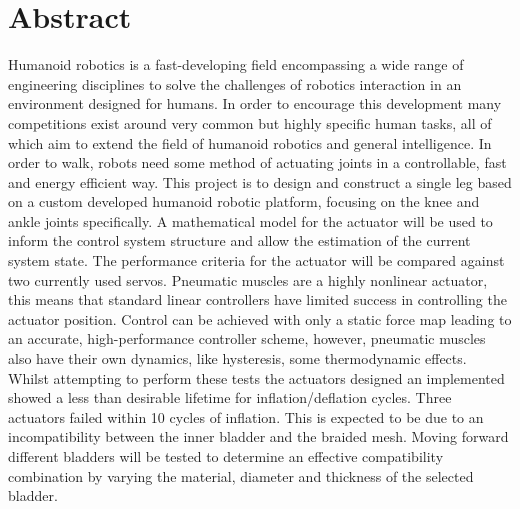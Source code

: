 \section*{Abstract}
Humanoid robotics is a fast-developing field encompassing a wide range of engineering disciplines to solve the challenges of robotics interaction in an environment designed for humans. In order to encourage this development many competitions exist around very common but highly specific human tasks, all of which aim to extend the field of humanoid robotics and general intelligence. In order to walk, robots need some method of actuating joints in a controllable, fast and energy efficient way. This project is to design and construct a single leg based on a custom developed humanoid robotic platform, focusing on the knee and ankle joints specifically. A mathematical model for the actuator will be used to inform the control system structure and allow the estimation of the current system state. The performance criteria for the actuator will be compared against two currently used servos. Pneumatic muscles are a highly nonlinear actuator, this means that standard linear controllers have limited success in controlling the actuator position. Control can be achieved with only a static force map leading to an accurate, high-performance controller scheme, however, pneumatic muscles also have their own dynamics, like hysteresis, some thermodynamic effects. 
Whilst attempting to perform these tests the actuators designed an implemented showed a less than desirable lifetime for inflation/deflation cycles. Three actuators failed within 10 cycles of inflation. This is expected to be due to an incompatibility between the inner bladder and the braided mesh. Moving forward different bladders will be tested to determine an effective compatibility combination by varying the material, diameter and thickness of the selected bladder.